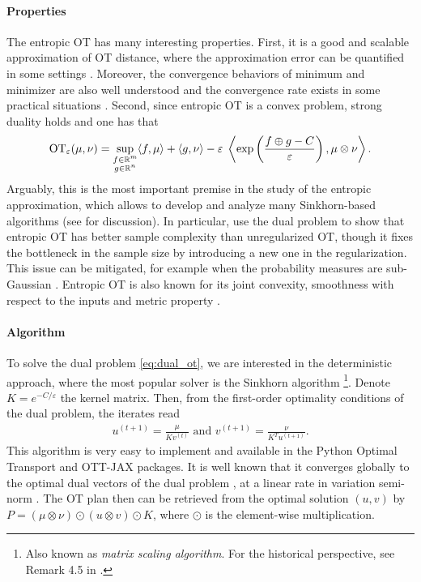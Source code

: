 \paragraph{Properties} The entropic OT has many interesting properties. First, it is a
good and scalable approximation of OT distance,
where the approximation error can be quantified in some settings \citep{Genevay19,Luise18}.
Moreover, the convergence behaviors of minimum and minimizer are also well understood
\citep{Leonard12,Carlier17} and the convergence rate exists in some practical situations
\citep{Genevay19,Cominetti94,Weed18}.
Second, since entropic OT is a convex problem, strong duality holds and one has that
\begin{align}
  \label{eq:dual_ot}
  \text{OT}_{\varepsilon}(\mu, \nu) = \sup_{\substack{f \in \mathbb R^m \\ g \in \mathbb R^n}}
  \langle f, \mu \rangle + \langle g, \nu \rangle
  - \varepsilon \; \left\langle \exp \left( \frac{f \oplus g - C}{\varepsilon} \right), \mu \otimes \nu \right\rangle.
\end{align}
Arguably, this is the most important premise in the study of the entropic approximation, which
allows to develop and analyze many Sinkhorn-based algorithms (see  for discussion).
In particular, \citep{Genevay19} use the dual problem to show that entropic OT
has better sample complexity than unregularized OT,
though it fixes the bottleneck in the sample size by introducing a new one in the regularization.
This issue can be mitigated, for example when the probability measures are sub-Gaussian \citep{Mena19}.
Entropic OT is also known for its joint convexity, smoothness with respect to
the inputs \citep{Luise18} and metric property \citep{Sanjabi18}.

\paragraph{Algorithm} To solve the dual problem \eqref{eq:dual_ot},
we are interested in the deterministic approach, where the most popular solver
is the Sinkhorn algorithm \citep{Sinkhorn67}
\footnote{Also known as \textit{matrix scaling algorithm}.
For the historical perspective, see Remark 4.5 in \citep{Peyre19}.}.
Denote $K = e^{-C / \varepsilon}$ the kernel matrix. Then,
from the first-order optimality conditions of the dual problem, the iterates read
\begin{align}
  u^{(t+1)} = \frac{\mu}{Kv^{(t)}} \text{ and } v^{(t+1)} = \frac{\nu}{K^T u^{(t+1)}}.
\end{align}
This algorithm is very easy to implement and available in the Python Optimal Transport
\citep{Flamary21} and OTT-JAX \citep{Cuturi22} packages.
It is well known that it converges globally to the optimal dual vectors of the dual problem
\citep{Sinkhorn67}, at a linear rate in variation semi-norm \citep{Franklin89}.
The OT plan then can be retrieved from the optimal solution $(u, v)$ by
$P = (\mu \otimes \nu) \odot (u \otimes v) \odot K$, where $\odot$ is the element-wise multiplication.

